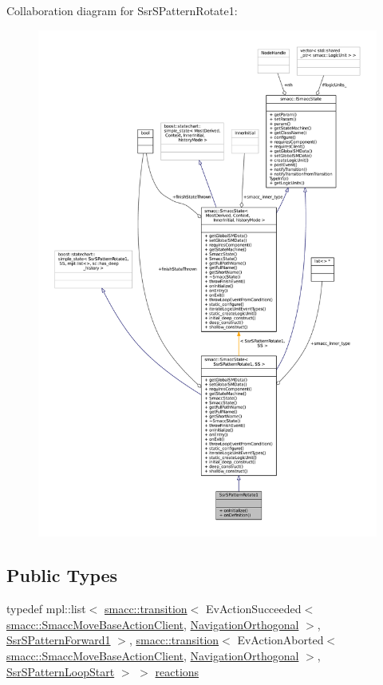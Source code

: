 Collaboration diagram for Ssr\+S\+Pattern\+Rotate1\+:
\nopagebreak
\begin{figure}[H]
\begin{center}
\leavevmode
\includegraphics[width=350pt]{structSsrSPatternRotate1__coll__graph}
\end{center}
\end{figure}
\subsection*{Public Types}
\begin{DoxyCompactItemize}
\item 
typedef mpl\+::list$<$ \hyperlink{classsmacc_1_1transition}{smacc\+::transition}$<$ Ev\+Action\+Succeeded$<$ \hyperlink{classsmacc_1_1SmaccMoveBaseActionClient}{smacc\+::\+Smacc\+Move\+Base\+Action\+Client}, \hyperlink{classNavigationOrthogonal}{Navigation\+Orthogonal} $>$, \hyperlink{structSsrSPatternForward1}{Ssr\+S\+Pattern\+Forward1} $>$, \hyperlink{classsmacc_1_1transition}{smacc\+::transition}$<$ Ev\+Action\+Aborted$<$ \hyperlink{classsmacc_1_1SmaccMoveBaseActionClient}{smacc\+::\+Smacc\+Move\+Base\+Action\+Client}, \hyperlink{classNavigationOrthogonal}{Navigation\+Orthogonal} $>$, \hyperlink{structSsrSPatternLoopStart}{Ssr\+S\+Pattern\+Loop\+Start} $>$ $>$ \hyperlink{structSsrSPatternRotate1_acdca1a29e072ed254ca12d3c2056368a}{reactions}
\end{DoxyCompactItemize}
